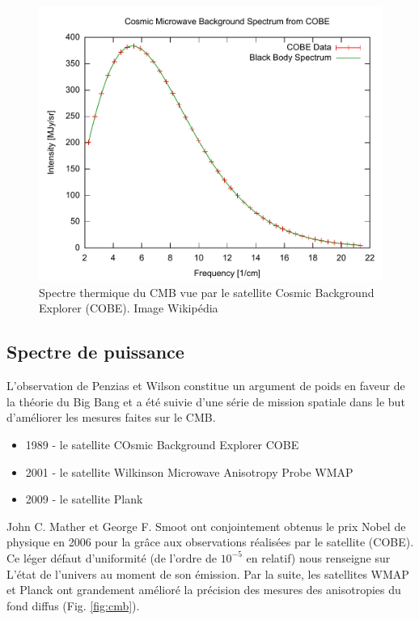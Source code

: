 \begin{figure}[htbp]
        \includegraphics[width=.95\linewidth]{img/01/Cmbr.pdf} 
        \caption{Spectre thermique du CMB vue par le satellite Cosmic Background Explorer (COBE). 
        Image Wikipédia}
 		\label{fig:cmb_thermal_spectrum}
\end{figure}




\subsection{Spectre de puissance}


L'observation de Penzias et Wilson constitue un argument de poids en faveur de la théorie du Big Bang et a été suivie d'une série de mission spatiale dans le but d'améliorer les mesures faites sur le CMB.

\begin{itemize}
\item 1989 - le satellite COsmic Background Explorer COBE 
\item 2001 - le satellite Wilkinson Microwave Anisotropy Probe WMAP
\item 2009 - le satellite Plank
\end{itemize}

John C. Mather et George F. Smoot ont conjointement obtenus le prix Nobel de physique en 2006 pour la \cite{CMBanisotropiesNobel} grâce aux observations réalisées par le satellite  (COBE).
Ce léger défaut d'uniformité (de l'ordre de $10^{-5}$ en relatif) nous renseigne sur L’état de l'univers au moment de son émission.
Par la suite, les satellites WMAP et Planck ont grandement amélioré la précision des mesures des anisotropies du fond diffus (Fig. \ref{fig:cmb}).

